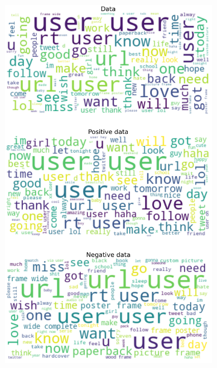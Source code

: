\documentclass{article}
\begin{document}
\begin{itemize}
  \begin{figure}[H]
    \centering
    \captionsetup{justification=centering}
    \begin{subfigure}[b]{0.24\textwidth}
      \centering
      \includegraphics[width=\textwidth]{chapter-06/section-01-01/07/visualization/1/wordcloud.png}
    \end{subfigure}
    \begin{subfigure}[b]{0.24\textwidth}
      \centering

\end{subfigure}
\end{figure}
\end{itemize}
\end{document}
